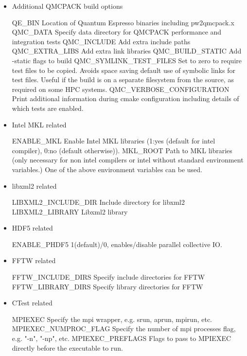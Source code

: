 \begin{itemize}
\item Additional QMCPACK build options

\begin{shade}
QE_BIN                 Location of Quantum Espresso binaries including pw2qmcpack.x
QMC_DATA               Specify data directory for QMCPACK performance and integration tests
QMC_INCLUDE            Add extra include paths
QMC_EXTRA_LIBS         Add extra link libraries
QMC_BUILD_STATIC       Add -static flags to build
QMC_SYMLINK_TEST_FILES Set to zero to require test files to be copied. Avoids space
                       saving default use of symbolic links for test files. Useful
                       if the build is on a separate filesystem from the source, as
                       required on some HPC systems.
QMC_VERBOSE_CONFIGURATION Print additional information during cmake configuration
                          including details of which tests are enabled.
\end{shade}

\item Intel MKL related
%
\begin{shade}
ENABLE_MKL          Enable Intel MKL libraries (1:yes (default for intel compiler),
                                                0:no (default otherwise)).
MKL_ROOT            Path to MKL libraries (only necessary for non intel compilers
                    or intel without standard environment variables.)
                    One of the above environment variables can be used.
\end{shade}

\item libxml2 related
%
\begin{shade}
LIBXML2_INCLUDE_DIR   Include directory for libxml2
LIBXML2_LIBRARY       Libxml2 library
\end{shade}

\item HDF5 related
%
\begin{shade}
ENABLE_PHDF5    1(default)/0, enables/disable parallel collective IO.
\end{shade}

\item FFTW related
%
\begin{shade}
FFTW_INCLUDE_DIRS   Specify include directories for FFTW
FFTW_LIBRARY_DIRS   Specify library directories for FFTW
\end{shade}

\item CTest related
%
\begin{shade}
MPIEXEC                Specify the mpi wrapper, e.g. srun, aprun, mpirun, etc.
MPIEXEC_NUMPROC_FLAG   Specify the number of mpi processes flag,
                       e.g. "-n", "-np", etc.
MPIEXEC_PREFLAGS     Flags to pass to MPIEXEC directly before the executable to run.   
\end{shade}


\end{itemize}
